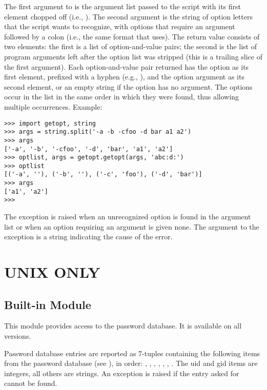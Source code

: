 The first argument to
is the argument list passed to the script with its first element
chopped off (i.e.,
).
The second argument is the string of option letters that the
script wants to recognize, with options that require an argument
followed by a colon (i.e., the same format that \UNIX{}
uses).
The return value consists of two elements: the first is a list of
option-and-value pairs; the second is the list of program arguments
left after the option list was stripped (this is a trailing slice of the
first argument).
Each option-and-value pair returned has the option as its first element,
prefixed with a hyphen (e.g.,
),
and the option argument as its second element, or an empty string if the
option has no argument.
The options occur in the list in the same order in which they were
found, thus allowing multiple occurrences.
Example:

\bcode\begin{verbatim}
>>> import getopt, string
>>> args = string.split('-a -b -cfoo -d bar a1 a2')
>>> args
['-a', '-b', '-cfoo', '-d', 'bar', 'a1', 'a2']
>>> optlist, args = getopt.getopt(args, 'abc:d:')
>>> optlist
[('-a', ''), ('-b', ''), ('-c', 'foo'), ('-d', 'bar')]
>>> args
['a1', 'a2']
>>> 
\end{verbatim}\ecode

The exception
is raised when an unrecognized option is found in the argument list or
when an option requiring an argument is given none.
The argument to the exception is a string indicating the cause of the
error.

\chapter{UNIX ONLY}

\section{Built-in Module }

This module provides access to the \UNIX{} password database.
It is available on all \UNIX{} versions.

Password database entries are reported as 7-tuples containing the
following items from the password database (see ), in order:
,
,
,
,
,
,
.
The uid and gid items are integers, all others are strings.
An exception is raised if the entry asked for cannot be found.

